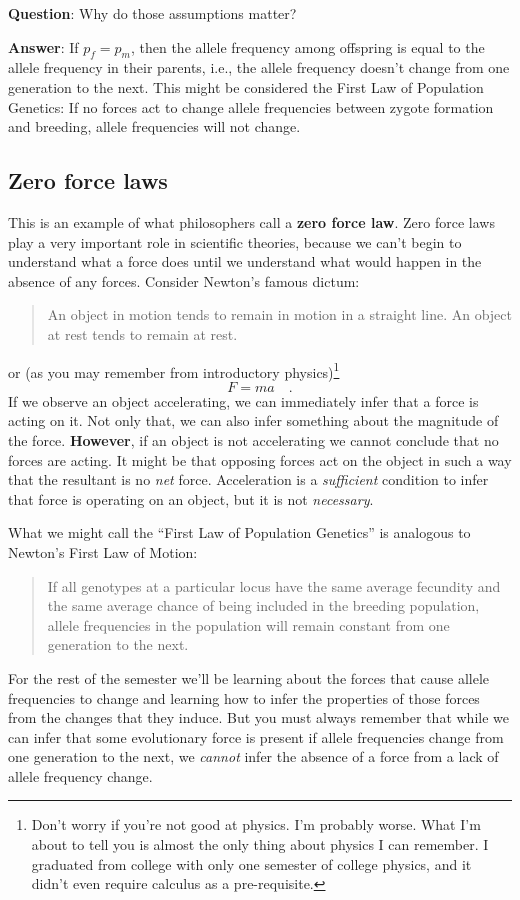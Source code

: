 {\bf Question}: Why do those assumptions matter?

{\bf Answer}: If $p_f = p_m$, then the allele frequency among offspring
is equal to the allele frequency in their parents, i.e., the allele
frequency doesn't change from one generation to the next. This might
be considered the First Law of Population Genetics: If no forces act
to change allele frequencies between zygote formation and breeding,
allele frequencies will not change.

\subsection*{Zero force laws}

This is an example of what philosophers call a {\bf zero force
law}. Zero force laws play a very important role in scientific
theories, because we can't begin to understand what a force does until
we understand what would happen in the absence of any forces. Consider
Newton's famous dictum: 
\begin{quotation}
\noindent An object in motion tends to remain in motion in a straight
line. An object at rest tends to remain at rest.
\end{quotation}
or (as you may remember from introductory physics)\footnote{Don't
  worry if you're not good at physics. I'm probably worse. What I'm
  about to tell you is almost the only thing about physics I can
  remember. I graduated from college with only one semester of college
  physics, and it didn't even require calculus as a pre-requisite.}
\[
F = ma \quad.
\]
\noindent If we observe an object accelerating, we can immediately
infer that a force is acting on it. Not only that, we can also infer
something about the magnitude of the force.  {\bf However}, if an
object is not accelerating we cannot conclude that no forces are
acting. It might be that opposing forces act on the object in such a
way that the resultant is no {\it net\/} force. Acceleration is a {\it
  sufficient\/} condition to infer that force is operating on an
object, but it is not {\it necessary}.

What we might call the ``First Law of Population Genetics'' is
analogous to Newton's First Law of Motion:
\begin{quotation}
\noindent If all genotypes at a particular locus have the same average
fecundity and the same average chance of being included in the breeding
population, allele frequencies in the population will remain constant
from one generation to the next.
\end{quotation}
For the rest of the semester we'll be learning about the forces that
cause allele frequencies to change and learning how to infer the
properties of those forces from the changes that they induce. But you
must always remember that while we can infer that some evolutionary
force is present if allele frequencies change from one generation to
the next, we {\it cannot\/} infer the absence of a force from a lack
of allele frequency change.



